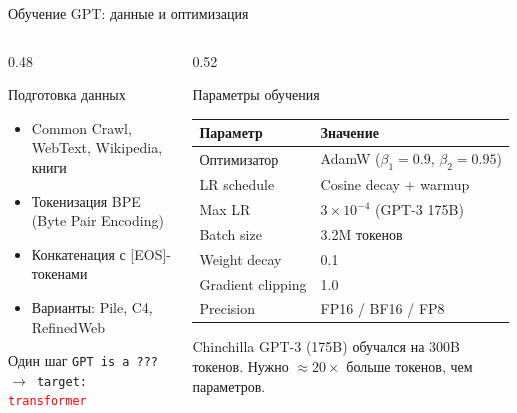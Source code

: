 \documentclass[aspectratio=169, 8pt]{beamer}
\begin{document}
\begin{frame}{Обучение GPT: данные и оптимизация}
  \begin{columns}[T]
    \begin{column}{0.48\textwidth}
      \begin{block}{Подготовка данных}
        \begin{itemize}
          \item Common Crawl, WebText, Wikipedia, книги
          \item Токенизация BPE (Byte Pair Encoding)
          \item Конкатенация с [EOS]-токенами
          \item Варианты: Pile, C4, RefinedWeb
        \end{itemize}
      \end{block}
      \begin{block}{Один шаг}
        \texttt{GPT is a ??? $\to$ target: \textcolor{red}{transformer}}
      \end{block}
    \end{column}
    \begin{column}{0.52\textwidth}
      \begin{block}{Параметры обучения}
        \begin{tabular}{ll}
          \toprule
          \textbf{Параметр} & \textbf{Значение} \\
          \midrule
          Оптимизатор & AdamW ($\beta_1=0.9$, $\beta_2=0.95$) \\
          LR schedule & Cosine decay + warmup \\
          Max LR & $3\times 10^{-4}$ (GPT-3 175B) \\
          Batch size & 3.2M токенов \\
          Weight decay & 0.1 \\
          Gradient clipping & 1.0 \\
          Precision & FP16 / BF16 / FP8 \\
          \bottomrule
        \end{tabular}
      \end{block}
      \begin{alertblock}{Chinchilla}
        GPT-3 (175B) обучался на 300B токенов. Нужно $\approx 20\times$ больше токенов, чем параметров.
      \end{alertblock}
    \end{column}
  \end{columns}
\end{frame}
\end{document}
